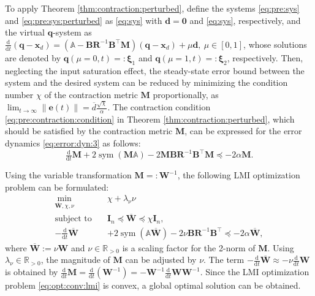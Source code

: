 \documentclass{ifacconf}
\newcommand\R{\mathbb{R}}
\newcommand*{\mv}[1]{\boldsymbol{#1}} %
\newcommand*{\mm}[1]{\boldsymbol{#1}} %
\newcommand*{\norm}[1]{\lVert #1 \rVert} %
\DeclareMathOperator{\mysym}{{sym}}       %
\newcommand\der{\mathrm d}
\newcommand*{\ddtt}{
   \tfrac{\der}{\der t}
}
\begin{document}
To apply Theorem \ref{thm:contraction:perturbed}, define the systems \eqref{eq:pre:sys} and \eqref{eq:pre:sys:perturbed} as \eqref{eq:sys} with $\mv{d}=\mv{0}$ and \eqref{eq:sys}, respectively, and the virtual $\mv{q}$-system as $\ddtt(\mv{q}-\mv{x}_d)=(\mathbb{A}-\mm{B}\mm{R}^{-1}\mm{B}^\top\mm{M})(\mv{q}-\mv{x}_d)+\mu\mv{d},\ \mu\in[0,1]$, whose solutions are denoted by $\mv{q}(\mu=0,t)=:\mv{\xi}_1$ and $\mv{q}(\mu=1,t)=:\mv{\xi}_2$, respectively.
Then, neglecting the input saturation effect, the steady-state error bound between the system and the desired system can be reduced by minimizing the condition number $\chi$ of the contraction metric $\mm{M}$ proportionally, as 
$
   \lim_{t\to\infty}
   \norm{\mv{e}(t)}
   =
   \overline{d}
   \tfrac{\sqrt{\chi}}{\alpha}
   .
$
The contraction condition \eqref{eq:pre:contraction:condition} in Theorem \ref{thm:contraction:perturbed}, which should be satisfied by the contraction metric $\mm{M}$, can be expressed for the error dynamics \eqref{eq:error:dyn:3} as follows:
\begin{equation} \label{eq:cstr:ctrc}
   \ddtt\mm{M}
   +
   2\mysym
   \left(
      \mm{M}
      \mathbb{A}
   \right)
   - 
   2
   \mm{M}\mm{B}\mm{R}^{-1}\mm{B}^\top\mm{M}
   \preceq
   -2\alpha \mm{M}
   .
\end{equation}

Using the variable transformation $\mm{M}=:\mm{W}^{-1}$, the following LMI optimization problem can be formulated:
\begin{align} \label{eq:opt:conv:lmi}
   \min_{
      \overline{\mm{W}},\chi,\nu
      } 
   \quad &
   \chi + \lambda_\nu \nu
   \\
   \text{subject to} 
   \quad & \nonumber
      \mm{I}_n
      \preceq
      \overline{\mm{W}}
      \preceq
      \chi \mm{I}_n
      ,
      \\  \nonumber   
      -
      \ddtt\overline{\mm{W}}
      &
      +
      2\mysym(
         \mathbb{A}\overline{\mm{W}}
      )
      -
      2\nu\mm{B}\mm{R}^{-1} \mm{B}^\top 
      \preceq
      -2\alpha\overline{\mm{W}}
      ,
\end{align} 
where $\overline{\mm{W}}:=\nu\mm{W}$ and $\nu\in\R_{>0}$ is a scaling factor for the 2-norm of $\mm{M}$.
Using $\lambda_\nu\in\R_{>0}$, the magnitude of $\mm{M}$ can be adjusted by $\nu$.
The term $-\ddtt\overline{\mm{W}}\approx-\nu\ddtt\mm{W}$ is obtained by $\ddtt\mm{M}=\ddtt(\mm{W}^{-1})=-\mm{W}^{-1}\ddtt\mm{W}\mm{W}^{-1}$.
Since the LMI optimization problem \eqref{eq:opt:conv:lmi} is convex, a global optimal solution can be obtained.
\end{document}
